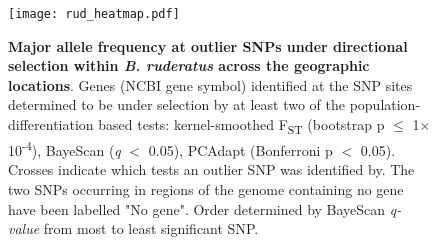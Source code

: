 \documentclass[12pt]{article}
\begin{document}
\begin{linenumbers}
		
		\begin{figure}[ht!]
			\centering
			\texttt{[image: rud\_heatmap.pdf]}
			\captionsetup{width=0.88\linewidth}
			\caption{\textbf{Major allele frequency at outlier SNPs under directional selection within \emph{B. ruderatus} across the geographic locations}. Genes (NCBI gene symbol) identified at the SNP sites determined to be under selection by at least two of the population-differentiation based tests: kernel-smoothed F\textsubscript{ST} (bootstrap p $\leq$ 1$\times$10\textsuperscript{-4}), BayeScan (\emph{q} $<$ 0.05), PCAdapt (Bonferroni p $<$ 0.05). Crosses indicate which tests an outlier SNP was identified by. The two SNPs occurring in regions of the genome containing no gene have been labelled "No gene". Order determined by BayeScan \emph{q-value} from most to least significant SNP.}
			\label{fig:rud_heat}
		\end{figure}
		


			


\end{linenumbers}
\end{document}
